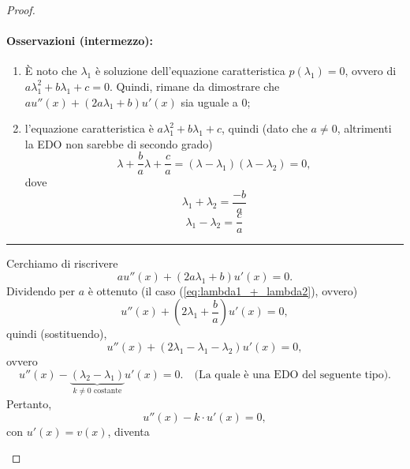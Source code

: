 \begin{proof}
\begin{enumerate}
		\paragraph{Osservazioni (intermezzo):}
		\begin{enumerate}
			\item È noto che $\lambda_1$ è soluzione dell'equazione caratteristica $p(\lambda_1)=0$, ovvero di $a\lambda_1^2+b\lambda_1 +c=0$. Quindi, rimane da dimostrare che $a u''(x)+(2a\lambda_1 + b)u'(x)$ sia uguale a 0;
			\item l'equazione caratteristica è $a\lambda_1^2+b\lambda_1 +c$, quindi (dato che $a\neq0$, altrimenti la EDO non sarebbe di secondo grado)
			\begin{equation*}
				\lambda + \frac{b}{a} \lambda + \frac{c}{a}= (\lambda - \lambda_1)(\lambda - \lambda_2) = 0,
			\end{equation*}
			dove
			\begin{equation}\label{eq:lambda1_+_lambda2}
				\lambda_1 + \lambda_2 = \frac{-b}{a}
			\end{equation}
			\begin{equation*}
				\lambda_1 - \lambda_2 = \frac{c}{a}
			\end{equation*}
		\end{enumerate}
		\hrule\vspace{2px}
		Cerchiamo di riscrivere
		\begin{equation*}
			a u''(x)+(2a\lambda_1 + b)u'(x)=0.
		\end{equation*}
		Dividendo per $a$ è ottenuto (il caso (\ref{eq:lambda1_+_lambda2}), ovvero)
		\begin{equation*}
			u''(x)+\left(2\lambda_1+\frac{b}{a}\right)u'(x)=0,
		\end{equation*}
		quindi (sostituendo),
		\begin{equation*}
			u''(x) + (2\lambda_1 -\lambda_1-\lambda_2) u'(x) = 0,
		\end{equation*}
		ovvero
		\begin{equation*}
			u''(x) - \underbrace{(\lambda_2-\lambda_1)}_{k\neq 0\text{ costante}} u'(x) = 0.\quad\text{(La quale è una EDO del seguente tipo)}.
		\end{equation*}
		Pertanto,
		\begin{equation*}
			u''(x)- k\cdot u'(x) = 0,
		\end{equation*}
		con $u'(x)=v(x)$, diventa
		\begin{equation}\label{eq:edo_variabili_separabili_dimostrazione_integrale_generale_edo_seecondo_grado}

\end{equation}
\end{enumerate}
\end{proof}
